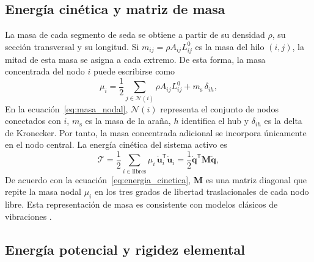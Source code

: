 \documentclass[11pt,letterpaper]{article}
\begin{document}
\subsection{Energía cinética y matriz de masa}

La masa de cada segmento de seda se obtiene a partir de su densidad $\rho$, su sección transversal y su longitud. Si $m_{ij}=\rho A_{ij}L_{ij}^{0}$ es la masa del hilo $(i,j)$, la mitad de esta masa se asigna a cada extremo. De esta forma, la masa concentrada del nodo $i$ puede escribirse como
\begin{equation}
\mu_i=\frac{1}{2}\sum_{j\in\mathcal{N}(i)}\rho A_{ij}L_{ij}^{0}
+m_{\mathrm{s}}\,\delta_{ih},
\label{eq:masa_nodal}
\end{equation}
En la ecuación~\eqref{eq:masa_nodal}, $\mathcal{N}(i)$ representa el conjunto de nodos conectados con $i$, $m_{\mathrm{s}}$ es la masa de la araña, $h$ identifica el hub y $\delta_{ih}$ es la delta de Kronecker. Por tanto, la masa concentrada adicional se incorpora únicamente en el nodo central. La energía cinética del sistema activo es
\begin{equation}
\mathcal{T}=\frac{1}{2}\sum_{i\in\mathrm{libres}}\mu_i\,\dot{\mathbf u}_i^{\mathsf T}\dot{\mathbf u}_i
=\frac{1}{2}\dot{\mathbf q}^{\mathsf T}\mathbf M\dot{\mathbf q},
\label{eq:energia_cinetica}
\end{equation}
De acuerdo con la ecuación~\eqref{eq:energia_cinetica}, $\mathbf M$ es una matriz diagonal que repite la masa nodal $\mu_i$ en los tres grados de libertad traslacionales de cada nodo libre. Esta representación de masa es consistente con modelos clásicos de vibraciones \cite{meirovitch2001}.

\subsection{Energía potencial y rigidez elemental}
\end{document}
